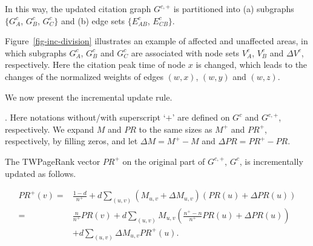 {In this way, the updated citation graph $G^{c,+}$ is partitioned into (a) subgraphs $\{G^c_A$, $G^c_B$, $G^c_C\}$ and (b) edge sets $\{E^c_{AB}$, $E^c_{CB}\}$.







\begin{example} \label{eg-layer-dag}
Figure~\ref{fig-inc-division} illustrates an example of affected and unaffected areas, in which subgraphs $G^c_A$, $G^c_B$ and $G^c_C$ are associated with node sets $V^c_A$, $V^c_B$ and $\Delta V^c$, respectively. Here the citation peak time of node $x$ is changed, which leads to the changes of the normalized weights of edges $(w,x)$, $(w,y)$ and $(w,z)$.
\end{example}

 We now present the incremental update rule.


. Here notations without/with superscript `$+$' are defined on $G^c$ and $G^{c,+}$, respectively.
We expand $M$ and $PR$ to the same sizes as $M^+$ and $PR^+$, respectively, by filling zeros, and let $\Delta M=M^+ - M$ and $\Delta PR = PR^+ - PR$.

The TWPageRank vector $PR^+$ on the original part of $G^{c,+}$, \ie $G^c$,  is incrementally updated as follows.
\begin{small}
\begin{equation}\label{eq-inc-prdag}
\begin{split}
PR^+(v) = &\frac{1-d}{n^+}+d \sum_{(u,v)} (M_{u,v}+\Delta M_{u,v}) (PR(u) + \Delta PR(u)) \\
 = &\frac{n}{n^+} PR(v) + d \sum_{(u,v)} M_{u,v} (\frac{n^+-n}{n^+} PR(u) + \Delta PR(u)) \\
   &+ d \sum_{(u,v)} \Delta M_{u,v} PR^+(u).
\end{split}
\end{equation}
\end{small}

}
